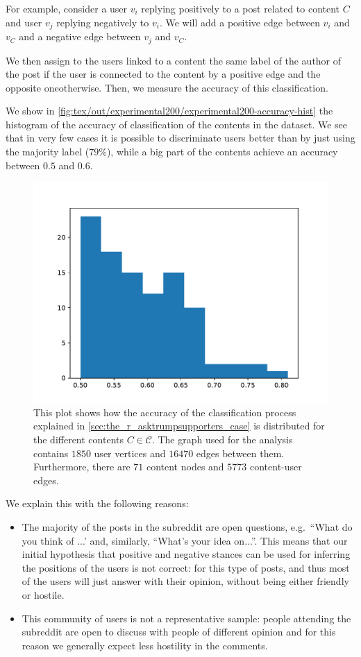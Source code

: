 For example, consider a user $v_i$
replying positively to a post related to content $C$ and user $v_j$ replying
negatively to $v_i$. We will add a positive edge between $v_i$ and $v_C$ and a
negative edge between $v_j$ and $v_C$.

We then assign to the users linked to a content the same label of the author of
the post if the user is connected to the content
by a positive edge and the opposite one\footnotemark otherwise. Then, we measure the accuracy of
this classification.


We show in \autoref{fig:tex/out/experimental200/experimental200-accuracy-hist}
the histogram of the accuracy of classification of the contents in the dataset.
We see that in very few cases it is possible to discriminate users better than
by just using the majority label ($79\%$), while a big part of the contents
achieve an accuracy between $0.5$ and $0.6$.

\begin{figure}
	\centering
	\includegraphics[width=0.6\linewidth]{tex/out/experimental200/experimental200-accuracy-hist.pdf}
	\caption[Distribution of accuracy of classification of r/asktrumpsupporters users for the
		different contents]{This plot shows how the accuracy of the classification
		process explained in \autoref{sec:the_r_asktrumpsupporters_case} is
		distributed for the different contents $C \in \mathcal{C} $. The graph
		used for the analysis contains $1850$ user vertices and
		$16470$ edges between them. Furthermore, there are $71$ content nodes
		and $5773$ content-user edges.}%
	\label{fig:tex/out/experimental200/experimental200-accuracy-hist}
\end{figure}

We explain this with the following reasons:
\begin{itemize}
	\item The majority of the posts in the subreddit are open questions, e.g.\ ``What
	      do you think of ...' and, similarly, ``What's your idea on...''. This
	      means that our initial hypothesis that positive and negative
	      stances can be used for inferring the positions of
	      the users is not correct: for this type of posts, and thus most of the users
	      will just answer with their opinion, without being either friendly or
	      hostile.
	\item This community of users is not a representative sample: people attending
	      the subreddit are open to discuss with people of different opinion
	      and for this reason we generally expect less hostility in the
	      comments.
\end{itemize}
